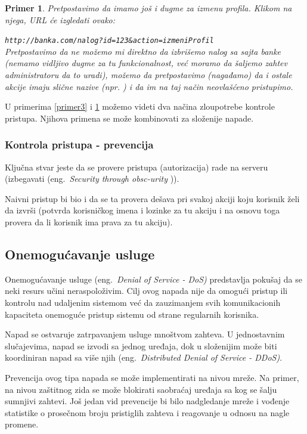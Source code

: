 \documentclass[a4paper]{article}
\newtheorem{primer}{Primer}[section]
\begin{document}
\begin{primer}
\label{primer4}
Pretpostavimo da imamo još i dugme za izmenu profila. Klikom na njega, URL će izgledati ovako:

\texttt{http://banka.com/nalog?id=123\&{}action=izmeniProfil}\\
Pretpostavimo da ne možemo mi direktno da izbrišemo nalog sa sajta banke (nemamo vidljivo dugme za tu funkcionalnost, već moramo da šaljemo zahtev administratoru da to uradi), možemo da pretpostavimo (nagađamo) da i ostale akcije imaju slične nazive (npr. ) i da im na taj način neovlašćeno pristupimo.\\
\end{primer}
U primerima \ref{primer3} i \ref{primer4} možemo videti dva načina zloupotrebe kontrole pristupa. Njihova primena se može kombinovati za složenije napade.

\subsubsection{Kontrola pristupa - prevencija}

Ključna stvar jeste da se provere pristupa (autorizacija) rade na serveru (izbegavati (eng.~{\em Security through obsc-urity} \cite{AS})). 

Naivni pristup bi bio i da se ta provera dešava pri svakoj akciji koju korisnik želi da izvrši (potvrda korisničkog imena i lozinke za tu akciju i na osnovu toga provera da li korisnik ima prava za tu akciju).

\subsection{Onemogućavanje usluge}
Onemogućavanje usluge (eng.~{\em Denial of Service - DoS)} \cite{DoSM} predstavlja pokušaj da se neki resurs učini neraspoloživim. Cilj ovog napada nije da omogući pristup ili kontrolu nad udaljenim sistemom već da zauzimanjem svih komunikacionih kapaciteta onemoguće pristup sistemu od strane regularnih korisnika.

Napad se ostvaruje zatrpavanjem usluge mnoštvom zahteva. U jednostavnim slučajevima, napad se izvodi sa jednog uređaja, dok u složenijim može biti koordiniran napad sa više njih (eng.~{\em Distributed Denial of Service - DDoS)}.

Prevencija ovog tipa napada se može implementirati na nivou mreže. Na primer, na nivou zaštitnog zida se može blokirati saobraćaj uređaja sa kog se šalju sumnjivi zahtevi. Još jedan vid prevencije bi bilo nadgledanje mreže i vođenje statistike o prosečnom broju pristiglih zahteva i reagovanje u odnosu na nagle promene.
\end{document}
